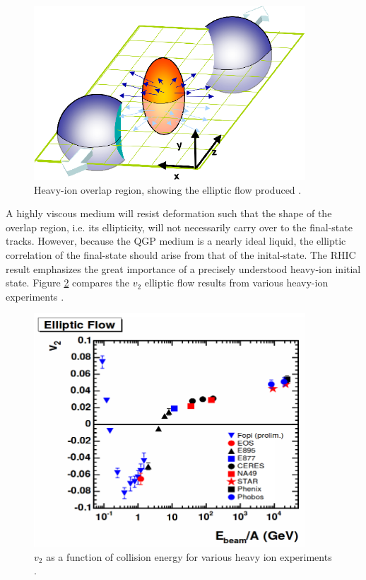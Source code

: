 \begin{figure}[h!]
\begin{centering}
\includegraphics[width=4in]{Chapter1/importfigs/elliptic_flow_3D_medium.png}
\par\end{centering}
\caption{Heavy-ion overlap region, showing the elliptic flow produced \cite{Heinz:2008tv}. \label{fig:overlap}}
\end{figure}
A highly viscous medium will resist deformation such that the shape of the overlap region, i.e. its ellipticity, will not necessarily carry over to the final-state tracks. However, because the QGP medium is a nearly ideal liquid, the elliptic correlation of the final-state should arise from that of the inital-state. The RHIC result emphasizes the great importance of a precisely understood heavy-ion initial state. Figure \ref{fig:hiFlow} compares the $v_2$ elliptic flow results from various heavy-ion experiments \cite{spsHI}.
\begin{figure}[h!]
\begin{centering}
\includegraphics[width=4in]{Chapter1/importfigs/elliptic_flow.png}
\par\end{centering}
\caption{$v_2$ as a function of collision energy for various heavy ion experiments \cite{spsHI}. \label{fig:hiFlow}}
\end{figure}

